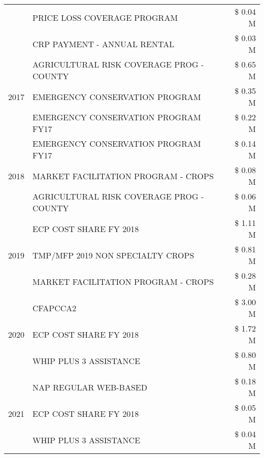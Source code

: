 \begin{tabular}{llr}
 & PRICE LOSS COVERAGE PROGRAM & \$ 0.04 M \\
 & CRP PAYMENT - ANNUAL RENTAL & \$ 0.03 M \\
\cline{1-3}
\multirow[t]{3}{*}{2017} & AGRICULTURAL RISK COVERAGE PROG - COUNTY & \$ 0.65 M \\
 & EMERGENCY CONSERVATION PROGRAM & \$ 0.35 M \\
 & EMERGENCY CONSERVATION PROGRAM FY17 & \$ 0.22 M \\
\cline{1-3}
\multirow[t]{3}{*}{2018} & EMERGENCY CONSERVATION PROGRAM FY17 & \$ 0.14 M \\
 & MARKET FACILITATION PROGRAM - CROPS & \$ 0.08 M \\
 & AGRICULTURAL RISK COVERAGE PROG - COUNTY & \$ 0.06 M \\
\cline{1-3}
\multirow[t]{3}{*}{2019} & ECP COST SHARE FY 2018 & \$ 1.11 M \\
 & TMP/MFP 2019 NON SPECIALTY CROPS & \$ 0.81 M \\
 & MARKET FACILITATION PROGRAM - CROPS & \$ 0.28 M \\
\cline{1-3}
\multirow[t]{3}{*}{2020} & CFAPCCA2 & \$ 3.00 M \\
 & ECP COST SHARE FY 2018 & \$ 1.72 M \\
 & WHIP PLUS 3 ASSISTANCE & \$ 0.80 M \\
\cline{1-3}
\multirow[t]{3}{*}{2021} & NAP REGULAR WEB-BASED & \$ 0.18 M \\
 & ECP COST SHARE FY 2018 & \$ 0.05 M \\
 & WHIP PLUS 3 ASSISTANCE & \$ 0.04 M \\
\cline{1-3}
\bottomrule
\end{tabular}
